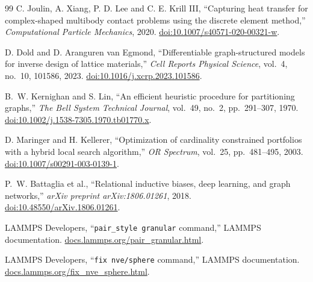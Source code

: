 \documentclass[12pt,a4paper]{article}
\begin{document}
\begin{thebibliography}{99}
		C. Joulin, A. Xiang, P. D. Lee and C. E. Krill III,
		``Capturing heat transfer for complex-shaped multibody contact problems using
		the discrete element method,''
		\emph{Computational Particle Mechanics}, 2020.
		\href{https://doi.org/10.1007/s40571-020-00321-w}
		{doi:10.1007/s40571-020-00321-w}.
		
		D. Dold and D. Aranguren van Egmond,
		``Differentiable graph-structured models for inverse design of lattice
		materials,''
		\emph{Cell Reports Physical Science}, vol.~4, no.~10, 101586, 2023.
		\href{https://doi.org/10.1016/j.xcrp.2023.101586}
		{doi:10.1016/j.xcrp.2023.101586}.
		
		B.~W. Kernighan and S. Lin,
		``An efficient heuristic procedure for partitioning graphs,''
		\emph{The Bell System Technical Journal}, vol.~49, no.~2,
		pp.~291--307, 1970.
		\href{https://doi.org/10.1002/j.1538-7305.1970.tb01770.x}
		{doi:10.1002/j.1538-7305.1970.tb01770.x}.
		
		D. Maringer and H. Kellerer,
		``Optimization of cardinality constrained portfolios with a hybrid local
		search algorithm,''
		\emph{OR Spectrum}, vol.~25, pp.~481--495, 2003.
		\href{https://doi.org/10.1007/s00291-003-0139-1}
		{doi:10.1007/s00291-003-0139-1}.
		
		P.~W. Battaglia et al.,
		``Relational inductive biases, deep learning, and graph networks,''
		\emph{arXiv preprint arXiv:1806.01261}, 2018.
		\href{https://doi.org/10.48550/arXiv.1806.01261}
		{doi:10.48550/arXiv.1806.01261}.
		
		LAMMPS Developers,
		``\texttt{pair\_style granular} command,'' LAMMPS documentation.
		\href{https://docs.lammps.org/pair_granular.html}
		{docs.lammps.org/pair\_granular.html}.

		LAMMPS Developers,
		``\texttt{fix nve/sphere} command,'' LAMMPS documentation.
		\href{https://docs.lammps.org/fix_nve_sphere.html}
		{docs.lammps.org/fix\_nve\_sphere.html}.
		
	\end{thebibliography}
	
\end{document}
